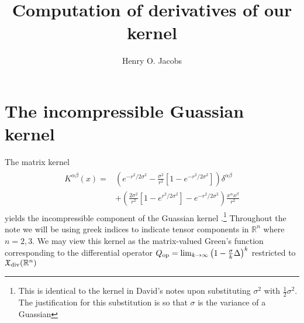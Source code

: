 \documentclass[12pt]{amsart}
\title{Computation of derivatives of our kernel}
\author{Henry O. Jacobs}
\begin{document}
\maketitle
\section{The incompressible Guassian kernel}
The matrix kernel
\begin{align}
\begin{split}  K^{\alpha \beta}(x) =& \left( e^{-r^2/2\sigma^2} - \frac{\sigma^2}{r^2}
    \left[ 1 - e^{-r^2/ 2\sigma^2} \right] \right) \delta^{\alpha \beta} \\
  &+ \left( \frac{2 \sigma^2}{r^2} \left[ 1 - e^{r^2 / 2 \sigma^2} \right] - e^{-r^2 / 2 \sigma^2 } \right) \frac{x^\alpha x^\beta }{r^2}
  \end{split} \label{eq:kernel}
\end{align}
yields the incompressible component of the Guassian kernel
\cite{MicheliGlaunes2014}.\footnote{This is identical to the kernel in David's notes upon substituting $\sigma^2$ with $\frac{1}{2} \sigma^2$.
The justification for this substitution is so that $\sigma$ is the variance of a Guassian}
Throughout the note we will be using greek indices to indicate tensor
components in $\mathbb{R}^n$ where $n = 2,3$.
We may view this kernel as the matrix-valued Green's function
corresponding to the differential operator $Q_{\rm op} = \lim_{k \to
  \infty} \left( 1 - \frac{\sigma}{k}\Delta \right)^k$ restricted to
  $\mathfrak{X}_{\rm div}( \mathbb{R}^n)$
\end{document}
